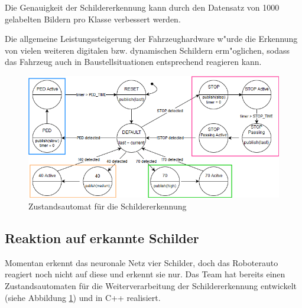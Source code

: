 Die Genauigkeit der Schildererkennung kann durch den Datensatz von 1000 gelabelten Bildern pro Klasse verbessert werden.

Die allgemeine Leistungssteigerung der Fahrzeughardware w"urde die Erkennung von vielen weiteren digitalen bzw. dynamischen Schildern erm"oglichen, sodass das Fahrzeug auch in Baustellsituationen entsprechend reagieren kann.

\begin{figure}[ht]
	\centering
	\includegraphics[width = 1\textwidth]{images/StateMachine.png}
	\caption{Zustandsautomat f\"ur die Schildererkennung}
	\label{fig:zustandsautomat}
\end{figure}

\subsection{Reaktion auf erkannte Schilder}
Momentan erkennt das neuronale Netz vier Schilder, doch das Roboterauto reagiert noch nicht auf diese und erkennt sie nur. Das Team hat bereits einen Zustandsautomaten f\"ur die Weiterverarbeitung der Schildererkennung entwickelt (siehe Abbildung \ref{fig:zustandsautomat}) und in C++ realisiert.

